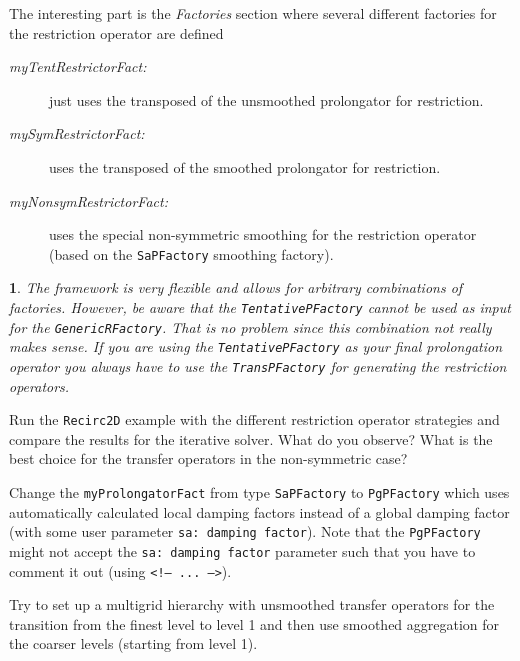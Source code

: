\documentclass[10pt,fleqn]{book}
\newtheorem*{mycomment}{\ding{42}}
\begin{document}


The interesting part is the \textit{Factories} section where several different factories for the restriction operator are defined
\begin{description}
\item[\textit{myTentRestrictorFact:}] just uses the transposed of the unsmoothed prolongator for restriction.
\item[\textit{mySymRestrictorFact:}] uses the transposed of the smoothed prolongator for restriction.
\item[\textit{myNonsymRestrictorFact:}] uses the special non-symmetric smoothing for the restriction operator (based on the \verb|SaPFactory| smoothing factory).
\end{description}

\begin{mycomment}
The \muelu framework is very flexible and allows for arbitrary combinations of factories. However, be aware that the \verb|TentativePFactory| cannot be used as input for the \verb|GenericRFactory|. That is no problem since this combination not really makes sense. If you are using the \verb|TentativePFactory| as your final prolongation operator you always have to use the \verb|TransPFactory| for generating the restriction operators.
\end{mycomment}

\begin{exercise}
Run the \verb|Recirc2D| example with the different restriction operator strategies and compare the results for the iterative solver. What do you observe? What is the best choice for the transfer operators in the non-symmetric case?
\end{exercise}
\begin{exercise}
Change the \verb|myProlongatorFact| from type \verb|SaPFactory| to \verb|PgPFactory| which uses automatically calculated local damping factors instead of a global damping factor (with some user parameter \texttt{sa: damping factor}). Note that the \verb|PgPFactory| might not accept the \verb|sa: damping factor| parameter such that you have to comment it out (using \texttt{<!-- ... -->}).
\end{exercise}
\begin{exercise}
Try to set up a multigrid hierarchy with unsmoothed transfer operators for the transition from the finest level to level 1 and then use smoothed aggregation for the coarser levels (starting from level 1).
\end{exercise}
\end{document}
